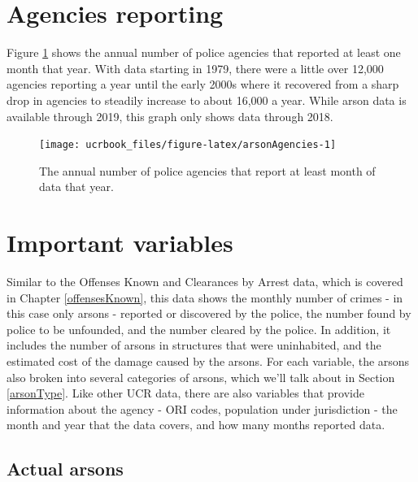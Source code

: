 \documentclass[
  12pt,
  openany]{book}
\begin{document}
\hypertarget{agencies-reporting-5}{%
\section{Agencies reporting}\label{agencies-reporting-5}}

Figure \ref{fig:arsonAgencies} shows the annual number of police agencies that reported at least one month that year. With data starting in 1979, there were a little over 12,000 agencies reporting a year until the early 2000s where it recovered from a sharp drop in agencies to steadily increase to about 16,000 a year. While arson data is available through 2019, this graph only shows data through 2018.

\begin{figure}

{\centering \texttt{[image: ucrbook\_files/figure-latex/arsonAgencies-1]} 

}

\caption{The annual number of police agencies that report at least month of data that year.}\label{fig:arsonAgencies}
\end{figure}

\hypertarget{important-variables-5}{%
\section{Important variables}\label{important-variables-5}}

Similar to the Offenses Known and Clearances by Arrest data, which is covered in Chapter \ref{offensesKnown}, this data shows the monthly number of crimes - in this case only arsons - reported or discovered by the police, the number found by police to be unfounded, and the number cleared by the police. In addition, it includes the number of arsons in structures that were uninhabited, and the estimated cost of the damage caused by the arsons. For each variable, the arsons also broken into several categories of arsons, which we'll talk about in Section \ref{arsonType}. Like other UCR data, there are also variables that provide information about the agency - ORI codes, population under jurisdiction - the month and year that the data covers, and how many months reported data.

\hypertarget{actual-arsons}{%
\subsection{Actual arsons}\label{actual-arsons}}
\end{document}
